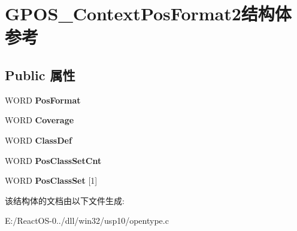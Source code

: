 \hypertarget{struct_g_p_o_s___context_pos_format2}{}\section{G\+P\+O\+S\+\_\+\+Context\+Pos\+Format2结构体 参考}
\label{struct_g_p_o_s___context_pos_format2}
\subsection*{Public 属性}
\begin{DoxyCompactItemize}
\item 
\mbox{\label{struct_g_p_o_s___context_pos_format2_ab2aa6b7d6cf9de9bf927189b6fcc4130}} 
W\+O\+RD {\bfseries Pos\+Format}
\item 
\mbox{\label{struct_g_p_o_s___context_pos_format2_a694966400738f2c0d089cb16bd2831b2}} 
W\+O\+RD {\bfseries Coverage}
\item 
\mbox{\label{struct_g_p_o_s___context_pos_format2_a5dca957ac3abc363d7c06de6e76509d0}} 
W\+O\+RD {\bfseries Class\+Def}
\item 
\mbox{\label{struct_g_p_o_s___context_pos_format2_aa0ec3a6cb41f1d475a85c8444098b68a}} 
W\+O\+RD {\bfseries Pos\+Class\+Set\+Cnt}
\item 
\mbox{\label{struct_g_p_o_s___context_pos_format2_af38b4a16e486141d18a3655144dc209c}} 
W\+O\+RD {\bfseries Pos\+Class\+Set} \mbox{[}1\mbox{]}
\end{DoxyCompactItemize}


该结构体的文档由以下文件生成\+:\begin{DoxyCompactItemize}
\item 
E\+:/\+React\+O\+S-\/0../dll/win32/usp10/opentype.\+c\end{DoxyCompactItemize}
